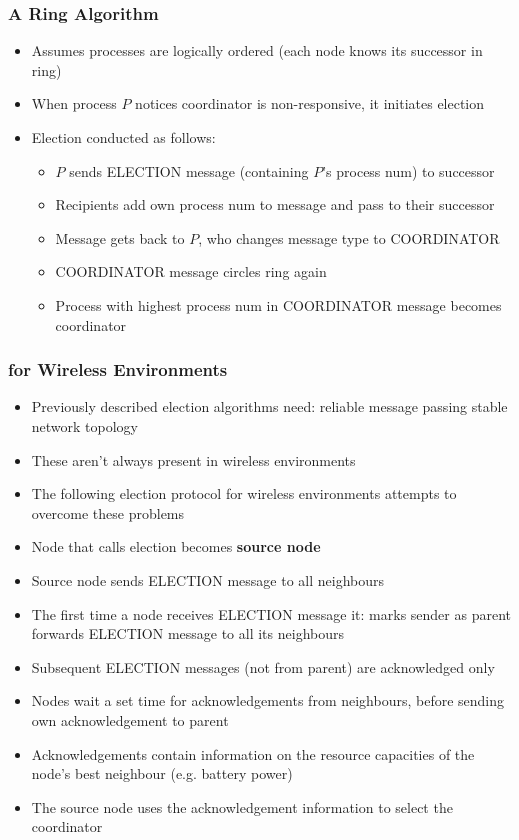 \begin{multicols}{2}
\subsubsection{A Ring Algorithm}
\begin{itemize}
	\item Assumes processes are logically ordered (each node knows its successor in ring)
	\item When process $P$ notices coordinator is non-responsive, it initiates election
	\item Election conducted as follows:
	\begin{itemize}
		\item $P$ sends ELECTION message (containing $P$'s process num) to successor
		\item Recipients add own process num to message and pass to  their successor
		\item Message gets back to $P$, who changes message type to COORDINATOR
		\item COORDINATOR message circles ring again
		\item Process with highest process num in COORDINATOR message becomes coordinator
	\end{itemize}	
\end{itemize}

\subsubsection{for Wireless Environments}
\begin{itemize}
	\item Previously described election algorithms need:
	\subitem reliable message passing
	\subitem stable network topology
	\item These aren't always present in wireless environments
	\item The following election protocol for wireless environments attempts to overcome these problems
	\item Node that calls election becomes \textbf{source node}
	\item Source node sends ELECTION message to all neighbours
	\item The first time a node receives ELECTION message it:
	\subitem marks sender as parent
	\subitem forwards ELECTION message to all its neighbours
	\item Subsequent ELECTION messages (not from parent) are acknowledged only
	\item Nodes wait a set time for acknowledgements from neighbours, before sending own acknowledgement to parent
	\item Acknowledgements contain information on the resource capacities of the node's best neighbour (e.g. battery power)
	\item The source node uses the acknowledgement information to select the coordinator	
\end{itemize}


\end{multicols}
